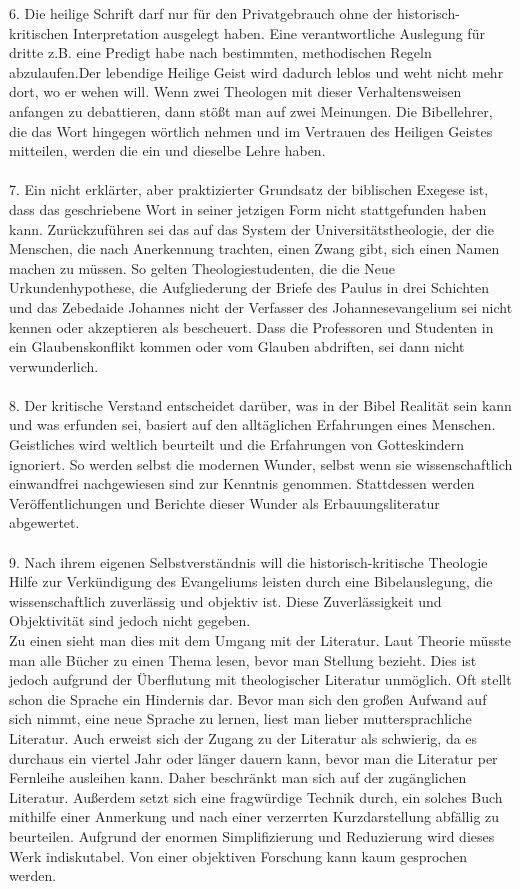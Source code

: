 6. Die heilige Schrift darf nur für den Privatgebrauch ohne der historisch-kritischen Interpretation ausgelegt haben. Eine verantwortliche Auslegung für dritte z.B. eine Predigt habe nach bestimmten, methodischen Regeln abzulaufen.Der lebendige Heilige Geist wird dadurch leblos und weht nicht mehr dort, wo er wehen will. Wenn zwei Theologen mit dieser Verhaltensweisen anfangen zu debattieren, dann stößt man auf zwei Meinungen. Die Bibellehrer, die das Wort hingegen wörtlich nehmen und im Vertrauen des Heiligen Geistes mitteilen, werden die ein und dieselbe Lehre haben. 
\\ ~ \\
7. Ein nicht erklärter, aber praktizierter Grundsatz der biblischen Exegese ist, dass das geschriebene Wort in seiner jetzigen Form nicht stattgefunden haben kann. Zurückzuführen sei das auf das System der Universitätstheologie, der die Menschen, die nach Anerkennung trachten, einen Zwang gibt, sich einen Namen machen zu müssen. So gelten Theologiestudenten, die die Neue Urkundenhypothese, die Aufgliederung der Briefe des Paulus in drei Schichten und das Zebedaide Johannes nicht der Verfasser des Johannesevangelium sei nicht kennen oder akzeptieren als bescheuert. Dass die Professoren und Studenten in ein Glaubenskonflikt kommen oder vom Glauben abdriften, sei dann nicht verwunderlich.     
\\ ~ \\
8. Der kritische Verstand entscheidet darüber, was in der Bibel Realität sein kann und was erfunden sei, basiert auf den alltäglichen Erfahrungen eines Menschen. Geistliches wird weltlich beurteilt und die Erfahrungen von Gotteskindern ignoriert. So werden selbst die modernen Wunder, selbst wenn sie wissenschaftlich einwandfrei nachgewiesen sind zur Kenntnis genommen. Stattdessen werden Veröffentlichungen und Berichte dieser Wunder als Erbauungsliteratur abgewertet.
\\ ~ \\
9. Nach ihrem eigenen Selbstverständnis will die historisch-kritische Theologie Hilfe zur Verkündigung des Evangeliums leisten durch eine Bibelauslegung, die wissenschaftlich zuverlässig und objektiv ist. Diese Zuverlässigkeit und Objektivität sind jedoch nicht gegeben.
\\
Zu einen sieht man dies mit dem Umgang mit der Literatur. Laut Theorie müsste man alle Bücher zu einen Thema lesen, bevor man Stellung bezieht. Dies ist jedoch aufgrund der Überflutung mit theologischer Literatur unmöglich. Oft stellt schon die Sprache ein Hindernis dar. Bevor man sich den großen Aufwand auf sich nimmt, eine neue Sprache zu lernen, liest man lieber muttersprachliche Literatur. Auch erweist sich der Zugang zu der Literatur als schwierig, da es durchaus ein viertel Jahr oder länger dauern kann, bevor man die Literatur per Fernleihe ausleihen kann. Daher beschränkt man sich auf der zugänglichen Literatur. Außerdem setzt sich eine fragwürdige Technik durch, ein solches Buch mithilfe einer Anmerkung und nach einer verzerrten Kurzdarstellung abfällig zu beurteilen. Aufgrund der enormen Simplifizierung und Reduzierung wird dieses Werk indiskutabel. Von einer objektiven Forschung kann kaum gesprochen werden.
